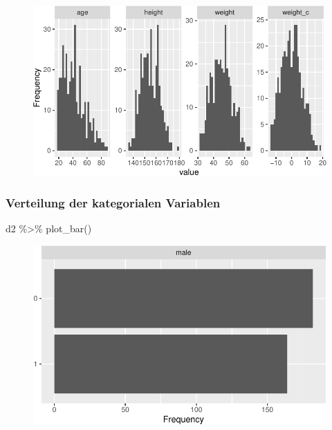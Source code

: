 \documentclass[
  a4paper,
  DIV=11]{scrreprt}
\newenvironment{Shaded}{\begin{snugshade}}{\end{snugshade}}
\newcommand{\FunctionTok}[1]{\textcolor[rgb]{0.28,0.35,0.67}{#1}}
\newcommand{\NormalTok}[1]{\textcolor[rgb]{0.00,0.23,0.31}{#1}}
\newcommand{\SpecialCharTok}[1]{\textcolor[rgb]{0.37,0.37,0.37}{#1}}
\theoremstyle{definition}
\theoremstyle{remark}
\begin{document}
\begin{figure}[H]

{\centering \includegraphics{./lineare-modelle_files/figure-pdf/unnamed-chunk-4-1.pdf}

}

\end{figure}

\hypertarget{verteilung-der-kategorialen-variablen}{%
\subsubsection{Verteilung der kategorialen
Variablen}\label{verteilung-der-kategorialen-variablen}}

\begin{Shaded}
\begin{Highlighting}[]
\NormalTok{d2 }\SpecialCharTok{\%\textgreater{}\%} \FunctionTok{plot\_bar}\NormalTok{()}
\end{Highlighting}
\end{Shaded}

\begin{figure}[H]

{\centering \includegraphics{./lineare-modelle_files/figure-pdf/unnamed-chunk-5-1.pdf}

}

\end{figure}
\end{document}
